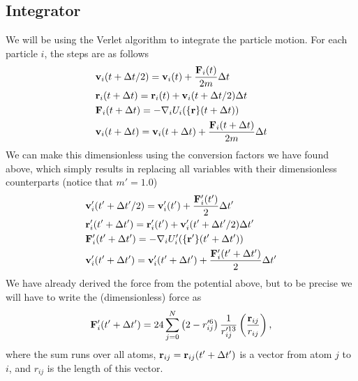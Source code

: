 \subsection*{Integrator}
We will be using the Verlet algorithm to integrate the particle motion. For each particle $i$, the steps are as follows
\begin{align}
    &\mathbf{v}_i(t + \Delta t/2) = \mathbf{v}_i(t) + \frac{\mathbf{F}_i(t)}{2m}\Delta t \\
    &\mathbf{r}_i(t + \Delta t) = \mathbf{r}_i(t) + \mathbf{v}_i(t + \Delta t/2)\Delta t \\
    &\mathbf{F}_i(t + \Delta t) = -\nabla_i U_i (\{ \mathbf{r}\}(t + \Delta t)) \\
    &\mathbf{v}_i(t + \Delta t) = \mathbf{v}_i(t + \Delta t) + \frac{\mathbf{F}_i(t + \Delta t)}{2m}\Delta t
\end{align}
We can make this dimensionless using the conversion factors we have found above, which simply results in replacing all variables with their dimensionless counterparts (notice that $m' = 1.0$)
\begin{align}
    &\mathbf{v}'_i(t' + \Delta t'/2) = \mathbf{v}'_i(t') + \frac{\mathbf{F}'_i(t')}{2}\Delta t' \\
    &\mathbf{r}'_i(t' + \Delta t') = \mathbf{r}'_i(t') + \mathbf{v}'_i(t' + \Delta t'/2)\Delta t' \\
    &\mathbf{F}'_i(t' + \Delta t') = -\nabla_i U'_i (\{ \mathbf{r}'\}(t' + \Delta t')) \\
    &\mathbf{v}'_i(t' + \Delta t') = \mathbf{v}'_i(t' + \Delta t') + \frac{\mathbf{F}'_i(t' + \Delta t')}{2}\Delta t'
\end{align}
We have already derived the force from the potential above, but to be precise we will have to write the (dimensionless) force as
\begin{align*}
    \mathbf{F}'_i(t' + \Delta t') = 24 \sum_{j = 0}^N \left( 2 - r_{ij}'^{6} \right) \frac{1}{r_{ij}'^{13}} \left(\frac{\mathbf{r}_{ij}}{r_{ij}}\right),
\end{align*}
where the sum runs over all atoms, $\mathbf{r}_{ij} = \mathbf{r}_{ij}(t' + \Delta t')$ is a vector from atom $j$ to $i$, and $r_{ij}$ is the length of this vector. 

